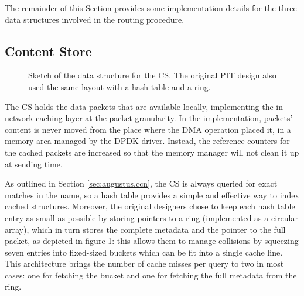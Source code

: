 \documentclass[11pt,a4paper,twoside,titlepage,openany]{book}
\begin{document}
The remainder of this Section provides some implementation details for the three data structures involved in the routing procedure.

\subsection{Content Store}\label{sec:augustus.cs}
\begin{figure}[tb]
  \begin{center}
    \caption[Sketch for the data structure for the CS and orignal PIT.]{Sketch of the data structure for the CS. The original PIT design also used the same layout with a hash table and a ring.}
    \label{fig:augustus.ht_ring}
  \end{center}
\end{figure}

The \gls{CS} holds the data packets that are available locally, implementing the in-network caching layer at the packet granularity. In the implementation, packets' content is never moved from the place where the \gls{DMA} operation placed it, in a memory area managed by the DPDK driver. Instead, the reference counters for the cached packets are increased so that the memory manager will not clean it up at sending time.

As outlined in Section \ref{sec:augustus.ccn}, the CS is always queried for exact matches in the name, so a hash table provides a simple and effective way to index cached structures. Moreover, the original designers chose to keep each hash table entry as small as possible by storing pointers to a ring (implemented as a circular array), which in turn stores the complete metadata and the pointer to the full packet, as depicted in figure \ref{fig:augustus.ht_ring}: this allows them to manage collisions by squeezing seven entries into fixed-sized buckets which can be fit into a single cache line. This architecture brings the number of cache misses per query to two in most cases: one for fetching the bucket and one for fetching the full metadata from the ring.
\end{document}
